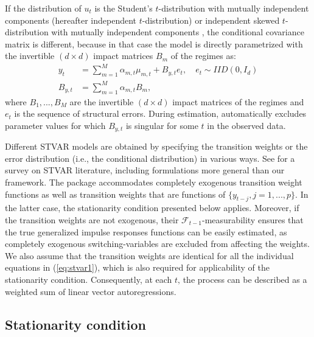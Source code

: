 \documentclass[nojss]{jss}
\begin{document}
If the distribution of $u_{t}$ is the Student's $t$-distribution with mutually independent components (hereafter independent $t$-distribution) or independent skewed $t$-distribution with mutually independent components \citep[see][]{Hansen:1994}, the conditional covariance matrix is different, because in that case the model is directly parametrized with the invertible $(d\times d)$ impact matrices $B_m$ of the regimes as:
\begin{align}
y_t &=\sum_{m=1}^M \alpha_{m,t}\mu_{m,t} + B_{y,t}e_t, \quad e_{t} \sim IID(0, I_d)\label{eq:bstvar1} \\
B_{y,t} &= \sum_{m=1}^{M}\alpha_{m,t}B_m,\label{eq:bstvar2}
\end{align}
where $B_1,...,B_M$ are the invertible $(d\times d)$ impact matrices of the regimes and $e_t$ is the sequence of structural errors. During estimation,  automatically excludes parameter values for which $B_{y,t}$ is singular for some $t$ in the observed data.

Different STVAR models are obtained by specifying the transition weights or the error distribution (i.e., the conditional distribution) in various ways. See \cite{Hubrich+Terasvirta:2013} for a survey on STVAR literature, including formulations more general than our framework. The package  accommodates completely exogenous transition weight functions as well as transition weights that are functions of $\lbrace y_{t-j}, j=1,...,p \rbrace$. In the latter case, the stationarity condition presented below applies. Moreover, if the transition weights are not exogenous, their $\mathcal{F}_{t-1}$-measurability ensures that the true generalized impulse responses functions \citep{Koop+Pesaran+Potter:1996} can be easily estimated, as completely exogenous switching-variables are excluded from affecting the weights. We also assume that the transition weights are identical for all the individual equations in (\ref{eq:stvar1}), which is also required for applicability of the stationarity condition. Consequently, at each $t$‚ the process can be described as a weighted sum of linear vector autoregressions.


\subsection{Stationarity condition}\label{sec:stationarity}
\end{document}
